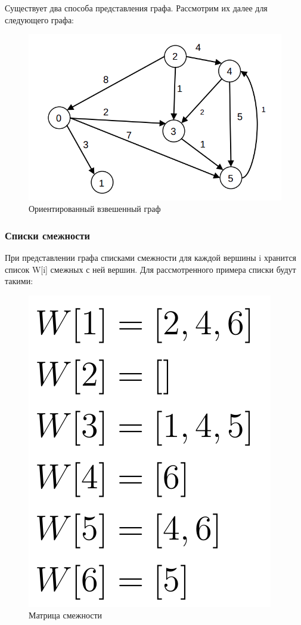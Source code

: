 Существует два способа представления графа. Рассмотрим их далее для следующего графа:
\begin{figure}[H]
	\begin{center}
		\includegraphics[scale=0.5]{images/graph.png}
	\end{center}
	\captionsetup{justification=centering}
	\caption{Ориентированный взвешенный граф}
	\label{img:graph}
\end{figure}

\subsubsection{Списки смежности}

При представлении графа списками смежности для каждой вершины i хранится список W[i] смежных с ней вершин. Для рассмотренного примера списки будут такими:
\begin{figure}[H]
	\begin{center}
		\includegraphics[scale=0.3]{images/matrixW.png}
	\end{center}
	\captionsetup{justification=centering}
	\caption{Матрица смежности}
	\label{img:graph}
\end{figure}

